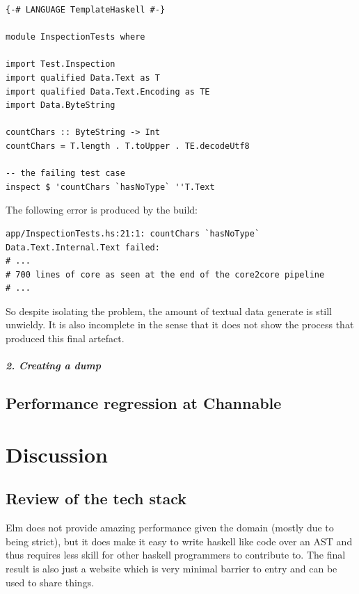 \documentclass{report}
\begin{document}
\begin{verbatim}
{-# LANGUAGE TemplateHaskell #-}

module InspectionTests where

import Test.Inspection
import qualified Data.Text as T
import qualified Data.Text.Encoding as TE
import Data.ByteString

countChars :: ByteString -> Int
countChars = T.length . T.toUpper . TE.decodeUtf8

-- the failing test case
inspect $ 'countChars `hasNoType` ''T.Text
\end{verbatim}

The following error is produced by the build:

\begin{verbatim}
app/InspectionTests.hs:21:1: countChars `hasNoType` Data.Text.Internal.Text failed:
# ...
# 700 lines of core as seen at the end of the core2core pipeline
# ...
\end{verbatim}

So despite isolating the problem, the amount of textual data generate is still unwieldy.
It is also incomplete in the sense that it does not show the process that produced this final
artefact.

\paragraph{2. Creating a dump}






\section{Performance regression at Channable}

%


\chapter{Discussion}

\section{Review of the tech stack}
Elm does not provide amazing performance given the domain (mostly due to being strict),
but it does make it easy to write haskell like code over an AST and thus requires less skill
for other haskell programmers to contribute to. The final result is also just a website which is
very minimal barrier to entry and can be used to share things.
\end{document}
